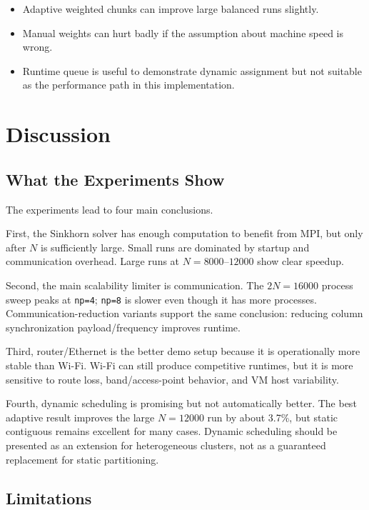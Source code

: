 \documentclass[12pt,a4paper]{article}
\begin{document}
\begin{itemize}
  \item Adaptive weighted chunks can improve large balanced runs slightly.
  \item Manual weights can hurt badly if the assumption about machine speed is wrong.
  \item Runtime queue is useful to demonstrate dynamic assignment but not suitable as the performance path in this implementation.
\end{itemize}

\section{Discussion}

\subsection{What the Experiments Show}

The experiments lead to four main conclusions.

First, the Sinkhorn solver has enough computation to benefit from MPI, but only after $N$ is sufficiently large. Small runs are dominated by startup and communication overhead. Large runs at $N=8000$--$12000$ show clear speedup.

Second, the main scalability limiter is communication. The $2N=16000$ process sweep peaks at \texttt{np=4}; \texttt{np=8} is slower even though it has more processes. Communication-reduction variants support the same conclusion: reducing column synchronization payload/frequency improves runtime.

Third, router/Ethernet is the better demo setup because it is operationally more stable than Wi-Fi. Wi-Fi can still produce competitive runtimes, but it is more sensitive to route loss, band/access-point behavior, and VM host variability.

Fourth, dynamic scheduling is promising but not automatically better. The best adaptive result improves the large $N=12000$ run by about 3.7\%, but static contiguous remains excellent for many cases. Dynamic scheduling should be presented as an extension for heterogeneous clusters, not as a guaranteed replacement for static partitioning.

\subsection{Limitations}
\end{document}
